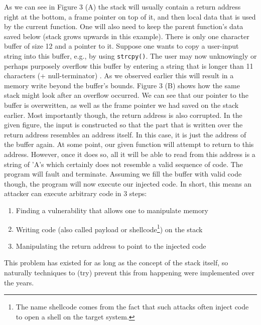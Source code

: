 \documentclass[10pt,twocolumn,a4paper]{article}
\begin{document}
\newline
As we can see in Figure 3 (A) the stack will usually contain a return address right at the bottom, a frame pointer on top of it, and then local data that is used by the current function.
One will also need to keep the parent function's data saved below (stack grows upwards in this example).
There is only one character buffer of size 12 and a pointer to it.
Suppose one wants to copy a user-input string into this buffer, e.g., by using \texttt{strcpy()}.
The user may now unknowingly or perhaps purposely overflow this buffer by entering a string that is longer than 11 characters (+ null-terminator) .
As we observed earlier this will result in a memory write beyond the buffer's bounds. 
Figure 3 (B) shows how the same stack might look after an overflow occurred. We can see that our pointer to the buffer is overwritten, as well as the frame pointer we had saved on the stack earlier.
Most importantly though, the return address is also corrupted.
In the given figure, the input is constructed so that the part that is written over the return address resembles an address itself.
In this case, it is just the address of the buffer again.
At some point, our given function will attempt to return to this address.
However, once it does so, all it will be able to read from this address is a string of 'A's which certainly does not resemble a valid sequence of code.
The program will fault and terminate.
Assuming we fill the buffer with valid code though, the program will now execute our injected code. In short, this means an attacker can execute arbitrary code in 3 steps:
\begin{enumerate}
	\item Finding a vulnerability that allows one to manipulate memory
	\item Writing code (also called payload or shellcode\footnote{The name shellcode comes from the fact that such attacks often inject code to open a shell on the target system.}) on the stack 
	\item Manipulating the return address to point to the injected code
\end{enumerate}
This problem has existed for as long as the concept of the stack itself, so naturally techniques to (try) prevent this from happening were implemented over the years.
\end{document}
